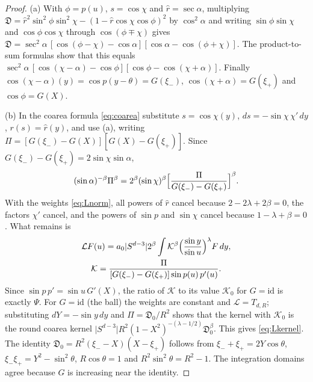 \documentclass[11pt]{amsart}
\numberwithin{equation}{section}
\theoremstyle{definition}
\theoremstyle{remark}
\newcommand{\abs}[1]{\lvert #1\rvert}
\newcommand{\id}{\mathrm{id}}
\newcommand{\Disc}{\mathfrak D}
\begin{document}
\begin{proof}
(a) With $\phi=p(u)$, $s=\cos\chi$ and $\hat r=\sec\alpha$, multiplying $\Disc=\hat r^2\sin^2\phi\sin^2\chi-(1-\hat r\cos\chi\cos\phi)^2$ by $\cos^2\alpha$ and writing $\sin\phi\sin\chi$ and $\cos\phi\cos\chi$ through $\cos(\phi\mp\chi)$ gives $\Disc=\sec^2\alpha\,[\cos(\phi-\chi)-\cos\alpha][\cos\alpha-\cos(\phi+\chi)]$. The product-to-sum formulas show that this equals $\sec^2\alpha\,[\cos(\chi-\alpha)-\cos\phi][\cos\phi-\cos(\chi+\alpha)]$. Finally $\cos(\chi-\alpha)(y)=\cos p(y-\theta)=G(\xi_-)$, $\cos(\chi+\alpha)=G(\xi_+)$ and $\cos\phi=G(X)$.

(b) In the coarea formula \eqref{eq:coarea} substitute $s=\cos\chi(y)$, $ds=-\sin\chi\,\chi'\,dy$, $r(s)=\hat r(y)$, and use (a), writing $\Pi=[G(\xi_-)-G(X)][G(X)-G(\xi_+)]$. Since $G(\xi_-)-G(\xi_+)=2\sin\chi\sin\alpha$,
\[
(\sin\alpha)^{-\beta}\Pi^\beta=2^\beta(\sin\chi)^\beta\Bigl[\frac{\Pi}{G(\xi_-)-G(\xi_+)}\Bigr]^\beta .
\]
With the weights \eqref{eq:Lnorm}, all powers of $\hat r$ cancel because $2-2\lambda+2\beta=0$, the factors $\chi'$ cancel, and the powers of $\sin p$ and $\sin\chi$ cancel because $1-\lambda+\beta=0$. What remains is
\begin{gather*}
\mathcal LF(u)=a_0\abs{S^{d-3}}2^\beta\int\mathcal K^\beta\Bigl(\frac{\sin y}{\sin u}\Bigr)^\lambda F\,dy,\\
\mathcal K=\frac{\Pi}{[G(\xi_-)-G(\xi_+)]\sin p(u)\,p'(u)} .
\end{gather*}
Since $\sin p\,p'=\sin u\,G'(X)$, the ratio of $\mathcal K$ to its value $\mathcal K_0$ for $G=\id$ is exactly $\Psi$. For $G=\id$ (the ball) the weights are constant and $\mathcal L=T_{d,R}$; substituting $dY=-\sin y\,dy$ and $\Pi=\Disc_0/R^2$ shows that the kernel with $\mathcal K_0$ is the round coarea kernel $\abs{S^{d-3}}R^2(1-X^2)^{-(\lambda-1/2)}\Disc_0^\beta$. This gives \eqref{eq:Lkernel}. The identity $\Disc_0=R^2(\xi_--X)(X-\xi_+)$ follows from $\xi_-+\xi_+=2Y\cos\theta$, $\xi_-\xi_+=Y^2-\sin^2\theta$, $R\cos\theta=1$ and $R^2\sin^2\theta=R^2-1$. The integration domains agree because $G$ is increasing near the identity.


\end{proof}
\end{document}
